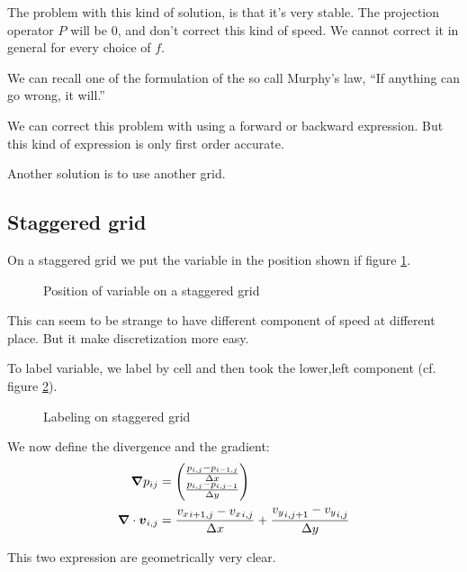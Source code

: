 The problem with this kind of solution, is that it's very stable.
The projection operator $P$ will be 0, and don't correct this kind of speed. We cannot correct it in general for every choice of $f$.

We can recall one of the formulation of the so call Murphy's law, ``If anything can go wrong, it will.''

We can correct this problem with using a forward or backward expression. But this kind of expression is only first order accurate.

Another solution is to use another grid.

\subsection{Staggered grid}

On a staggered grid we put the variable in the position shown if figure \ref{fixed:staggered}.

\begin{figure}
\caption{Position of variable on a staggered grid}
\label{fixed:staggered}
\end{figure}

This can seem to be strange to have different component of speed at different place. But it make discretization more easy.

To label variable, we label by cell and then took the lower,left component (cf. figure \ref{fixed:staggered_label}).

\begin{figure}
\caption{Labeling on staggered grid}
\label{fixed:staggered_label}
\end{figure}

We now define the divergence and the gradient:
\begin{align}
  {\boldsymbol {\nabla}}p_{ij}&=\begin{pmatrix}
    \frac{p_{i,j}-p_{i-1,j}}{\Delta x}\\
    \frac{p_{i,j}-p_{i,j-1}}{\Delta y}\\
                      \end{pmatrix}\\
  {\boldsymbol {\nabla}}\cdot {\boldsymbol {v}}_{i,j}&=\frac{{v_{x}}_{i+1,j}-{v_{x}}_{i,j}}{\Delta x}+\frac{{v_{y}}_{i,j+1}-{v_{y}}_{i,j}}{\Delta y}
\end{align}

This two expression are geometrically very clear.

